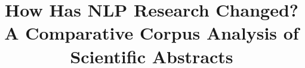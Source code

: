 %
%
%
%

\documentclass[11pt]{article}
\usepackage{acl}      %
\usepackage{times}
\usepackage{latexsym}
\usepackage{microtype}
\usepackage{graphicx}
\usepackage{booktabs}
\usepackage{amsmath}
\usepackage{xcolor}
\setlength{\textfloatsep}{8pt plus 2pt minus 2pt}
\setlength{\intextsep}{8pt plus 2pt minus 2pt}
\setlength{\abovecaptionskip}{4pt}
\setlength{\belowcaptionskip}{2pt}
\setlength{\tabcolsep}{4pt}
\setlength{\abovedisplayskip}{4pt plus 1pt minus 1pt}
\setlength{\belowdisplayskip}{4pt plus 1pt minus 1pt}
\setlength{\abovedisplayshortskip}{2pt plus 1pt minus 1pt}
\setlength{\belowdisplayshortskip}{2pt plus 1pt minus 1pt}
\renewcommand{\arraystretch}{0.95}
\graphicspath{{figures/}}


\newcommand{\TODO}[2]{\noindent\textcolor{red}{\textbf{[#1]}}\textcolor{gray}{\small\textit{ (~#2 words)}}\medskip}
\newcommand{\WC}[1]{\noindent\textcolor{gray}{\footnotesize[Target: #1 words]}\smallskip}

\title{How Has NLP Research Changed? \\
A Comparative Corpus Analysis of Scientific Abstracts}

